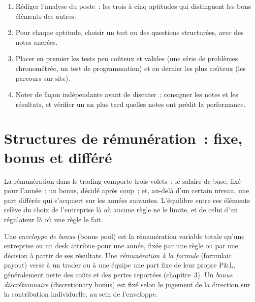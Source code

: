 \begin{method}\label{met:fm:hiring-and-compensation:loop}
\begin{enumerate}
\item Rédiger l'analyse du poste~: les trois à cinq aptitudes qui distinguent les bons éléments des autres.
\item Pour chaque aptitude, choisir un test ou des questions structurées, avec des notes ancrées.
\item Placer en premier les tests peu coûteux et valides (une série de problèmes chronométrée, un test de programmation) et en dernier les plus coûteux (les parcours sur site).
\item Noter de façon indépendante avant de discuter~; consigner les notes et les résultats, et vérifier un an plus tard quelles notes ont prédit la performance.
\end{enumerate}
\end{method}

\section{Structures de rémunération~: fixe, bonus et différé}

La rémunération dans le trading comporte trois volets~: le salaire de base, fixé pour l'année~; un bonus, décidé après coup~; et, au-delà d'un certain niveau, une part différée qui s'acquiert
sur les années suivantes. L'équilibre entre ces éléments relève du choix de l'entreprise là où aucune règle ne le limite, et de celui d'un régulateur là où une règle le fait.

\begin{definition}\label{def:fm:hiring-and-compensation:pool}
Une \emph{enveloppe de bonus} (bonus pool) est la rémunération variable totale qu'une entreprise ou un desk attribue pour une année, fixée par une règle ou par une décision à partir de ses résultats.
Une \emph{rémunération à la formule} (formulaic payout) verse à un trader ou à une équipe une part fixe de leur propre P\&L, généralement nette des coûts et des pertes
reportées (chapitre~3). Un \emph{bonus discrétionnaire} (discretionary bonus) est fixé selon le jugement de la direction
sur la contribution individuelle, au sein de l'enveloppe.
\end{definition}

